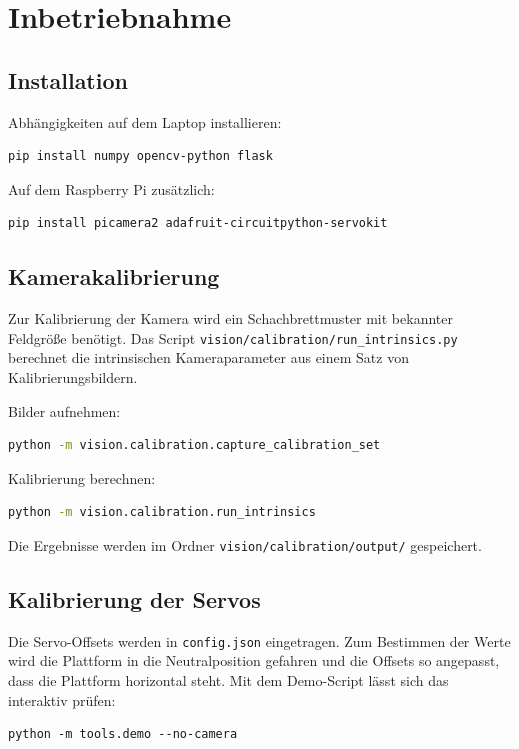 \documentclass[11pt, a4paper]{scrreprt}
\begin{document}
\chapter{Inbetriebnahme}

\section{Installation}

Abhängigkeiten auf dem Laptop installieren:

\begin{lstlisting}[language=bash]
pip install numpy opencv-python flask
\end{lstlisting}

Auf dem Raspberry Pi zusätzlich:

\begin{lstlisting}[language=bash]
pip install picamera2 adafruit-circuitpython-servokit
\end{lstlisting}

\section{Kamerakalibrierung}

Zur Kalibrierung der Kamera wird ein Schachbrettmuster mit bekannter
Feldgröße benötigt. Das Script \texttt{vision/calibration/run\_intrinsics.py}
berechnet die intrinsischen Kameraparameter aus einem Satz von
Kalibrierungsbildern.

Bilder aufnehmen:

\begin{lstlisting}[language=bash]
python -m vision.calibration.capture_calibration_set
\end{lstlisting}

Kalibrierung berechnen:

\begin{lstlisting}[language=bash]
python -m vision.calibration.run_intrinsics
\end{lstlisting}

Die Ergebnisse werden im Ordner \texttt{vision/calibration/output/} gespeichert.

\section{Kalibrierung der Servos}

Die Servo-Offsets werden in \texttt{config.json} eingetragen.
Zum Bestimmen der Werte wird die Plattform in die Neutralposition gefahren
und die Offsets so angepasst, dass die Plattform horizontal steht.
Mit dem Demo-Script lässt sich das interaktiv prüfen:

\begin{lstlisting}
python -m tools.demo --no-camera
\end{lstlisting}
\end{document}
